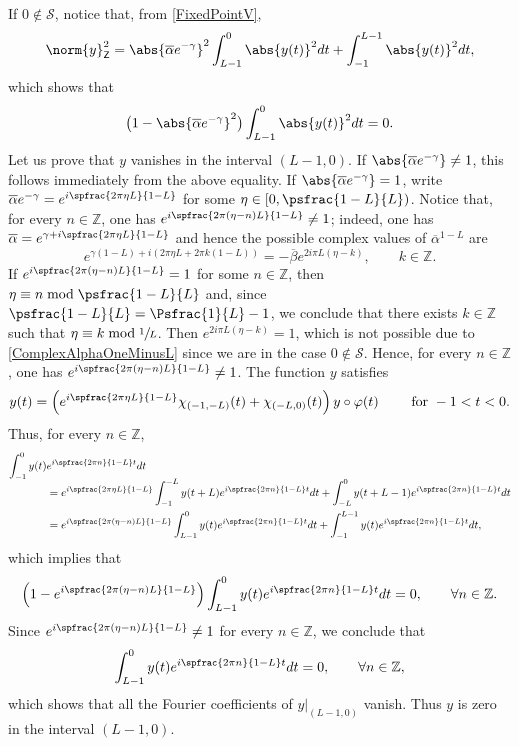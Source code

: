 If $0 \notin \mathcal S$, notice that, from \eqref{FixedPointV},
\[
\norm{y}_{\mathsf Z}^2 = \abs{\overline\alpha e^{-\gamma}}^2 \int_{L-1}^{0} \abs{y(t)}^2 dt + \int_{-1}^{L - 1} \abs{y(t)}^2 dt,
\]
which shows that
\[
\bigl(1 - \abs{\overline\alpha e^{-\gamma}}^2\bigr) \int_{L-1}^{0} \abs{y(t)}^2 dt = 0.
\]
Let us prove that $y$ vanishes in the interval $(L - 1, 0)$. If $\abs{\overline\alpha e^{-\gamma}} \neq 1$, this follows immediately from the above equality. If $\abs{\overline\alpha e^{-\gamma}} = 1$, write $\overline\alpha e^{-\gamma} = e^{i \spfrac{2\pi\eta L}{1 - L}}$ for some $\eta \in \left[0, \psfrac{1-L}{L}\right)$. Notice that, for every $n \in \mathbb Z$, one has $e^{i \spfrac{2\pi(\eta - n) L}{1 - L}} \neq 1$; indeed, one has $\overline\alpha = e^{\gamma + i \spfrac{2\pi\eta L}{1 - L}}$ and hence the possible complex values of $\overline\alpha^{1-L}$ are
\begin{equation}
\label{ComplexAlphaOneMinusL}
e^{\gamma (1 - L) + i (2\pi\eta L + 2\pi k (1 - L))} = -\overline\beta e^{2 i \pi L (\eta - k)}, \qquad k \in \mathbb Z.
\end{equation}
If $e^{i \spfrac{2\pi(\eta - n) L}{1 - L}} = 1$ for some $n \in \mathbb Z$, then $\eta \equiv n \bmod \psfrac{1-L}{L}$ and, since $\psfrac{1-L}{L} = \Psfrac{1}{L} - 1$, we conclude that there exists $k \in \mathbb Z$ such that $\eta \equiv k \bmod \sfrac{1}{L}$. Then $e^{2 i \pi L (\eta - k)} = 1$, which is not possible due to \eqref{ComplexAlphaOneMinusL} since we are in the case $0 \notin \mathcal S$. Hence, for every $n \in \mathbb Z$, one has $e^{i \spfrac{2\pi(\eta - n) L}{1 - L}} \neq 1$. The function $y$ satisfies
\[
y(t) = \left(e^{i \spfrac{2\pi\eta L}{1 - L}} \chi_{(-1, -L)}(t) + \chi_{(-L, 0)}(t)\right) y \circ \varphi(t) \qquad \text{ for } -1 < t < 0.
\]
Thus, for every $n \in \mathbb Z$,
\begin{align*}
\int_{-1}^0 y(t) &e^{i \spfrac{2 \pi n}{1-L} t} dt\\[-5pt]
 & = e^{i \spfrac{2\pi\eta L}{1 - L}} \int_{-1}^{-L} y(t + L) e^{i \spfrac{2 \pi n}{1-L} t} dt + \int_{-L}^0 y(t + L - 1) e^{i \spfrac{2 \pi n}{1-L} t} dt \\
& = e^{i \spfrac{2\pi(\eta - n) L}{1 - L}} \int_{L-1}^{0} y(t) e^{i \spfrac{2 \pi n}{1-L} t} dt + \int_{-1}^{L - 1} y(t) e^{i \spfrac{2 \pi n}{1-L} t} dt,
\end{align*}
which implies that
\[
\left(1 - e^{i \spfrac{2\pi(\eta - n) L}{1 - L}}\right) \int_{L-1}^{0} y(t) e^{i \spfrac{2 \pi n}{1-L} t} dt = 0, \qquad \forall n \in \mathbb Z.
\]
Since $e^{i \spfrac{2\pi(\eta - n) L}{1 - L}} \neq 1$ for every $n \in \mathbb Z$, we conclude that
\[
\int_{L-1}^{0} y(t) e^{i \spfrac{2 \pi n}{1-L} t} dt = 0, \qquad \forall n \in \mathbb Z,
\]
which shows that all the Fourier coefficients of $y|_{(L-1, 0)}$ vanish. Thus $y$ is zero in the interval $(L-1, 0)$.


